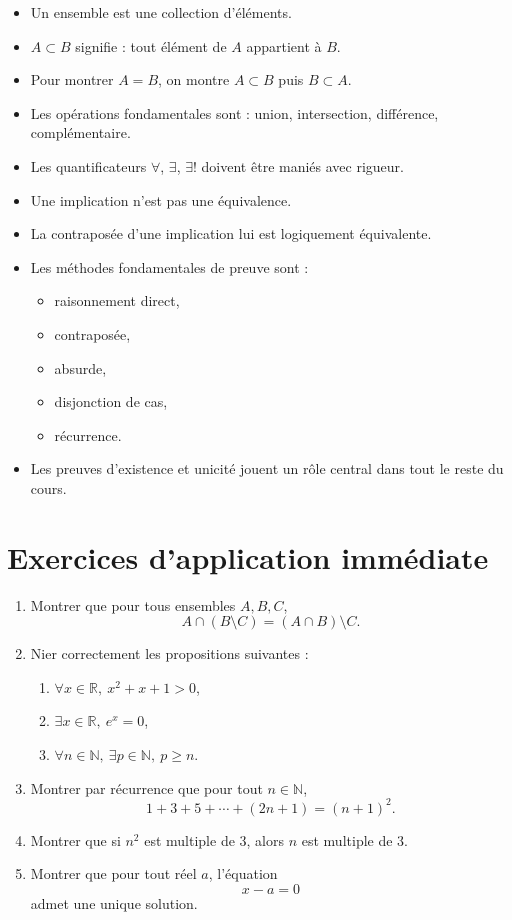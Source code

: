\documentclass[11pt,a4paper]{article}
\theoremstyle{remark}
\newcommand{\R}{\mathbb{R}}
\newcommand{\N}{\mathbb{N}}
\begin{document}
\begin{itemize}
    \item Un ensemble est une collection d’éléments.
    \item \(A\subset B\) signifie : tout élément de \(A\) appartient à \(B\).
    \item Pour montrer \(A=B\), on montre \(A\subset B\) puis \(B\subset A\).
    \item Les opérations fondamentales sont : union, intersection, différence, complémentaire.
    \item Les quantificateurs \(\forall\), \(\exists\), \(\exists !\) doivent être maniés avec rigueur.
    \item Une implication n’est pas une équivalence.
    \item La contraposée d’une implication lui est logiquement équivalente.
    \item Les méthodes fondamentales de preuve sont :
    \begin{itemize}
        \item raisonnement direct,
        \item contraposée,
        \item absurde,
        \item disjonction de cas,
        \item récurrence.
    \end{itemize}
    \item Les preuves d’existence et unicité jouent un rôle central dans tout le reste du cours.
\end{itemize}

\section*{Exercices d’application immédiate}

\begin{enumerate}[label=\textbf{Exercice \arabic*.}]
    \item Montrer que pour tous ensembles \(A,B,C\),
    \[
    A\cap(B\setminus C)=(A\cap B)\setminus C.
    \]

    \item Nier correctement les propositions suivantes :
    \begin{enumerate}
        \item \(\forall x\in\R,\ x^2+x+1>0\),
        \item \(\exists x\in\R,\ e^x=0\),
        \item \(\forall n\in\N,\ \exists p\in\N,\ p\geq n\).
    \end{enumerate}

    \item Montrer par récurrence que pour tout \(n\in\N\),
    \[
    1+3+5+\cdots +(2n+1)=(n+1)^2.
    \]

    \item Montrer que si \(n^2\) est multiple de \(3\), alors \(n\) est multiple de \(3\).

    \item Montrer que pour tout réel \(a\), l’équation
    \[
    x-a=0
    \]
    admet une unique solution.
\end{enumerate}
\end{document}
